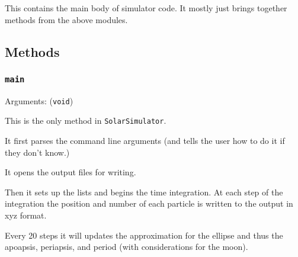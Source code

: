 \documentclass[a4paper, 11pt, british, left=1in, right=1in, top=0.3in, bottom=1in]{article}
\begin{document}
	This contains the main body of simulator code. It mostly just brings together methods from the above modules. 
	
	\subsection{Methods}
	
	\subsubsection{\texttt{main}}
	
	Arguments: (\texttt{void})
	
	This is the only method in \texttt{SolarSimulator}.
	
	It first parses the command line arguments (and tells the user how to do it if they don't know.) 
	
	It opens the output files for writing.
	
	Then it sets up the lists and begins the time integration. At each step of the integration the position and number of each particle is written to the output in xyz format. 
	
	Every 20 steps it will updates the approximation for the ellipse and thus the apoapsis, periapsis, and period (with considerations for the moon). 
\end{document}
